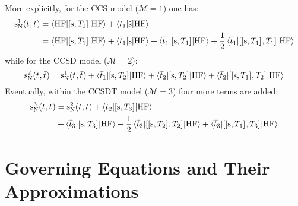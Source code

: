 More explicitly, for the \gls{CCS} model ($\mathcal{M} = 1$) one has:
\begin{equation}
  \begin{aligned}
  \mathrm{s}_{\mathrm{N}}^1(t_{}, \bar{t}_{}) &=
  \braket{\mathrm{HF} | [ \mathrm{s}, T_1 ]^{} | \mathrm{HF}}
  + \braket{\bar{t}_{1} | \check{\mathrm{s}} | \mathrm{HF}} \\
  &=
  \braket{\mathrm{HF} | [ \mathrm{s}, T_1 ]^{} | \mathrm{HF}}
  + \braket{\bar{t}_{1} | \mathrm{s} | \mathrm{HF}}
  + \braket{\bar{t}_{1} | [ \mathrm{s}, T_1 ]^{} | \mathrm{HF}}
  + \frac{1}{2}\braket{\bar{t}_{1} | [ [ \mathrm{s}, T_1 ]^{}, T_1 ]^{} | \mathrm{HF}}
  \end{aligned}
\end{equation}
while for the \gls{CCSD} model ($\mathcal{M} = 2$):
\begin{equation}
  \mathrm{s}_{\mathrm{N}}^2(t_{}, \bar{t}_{}) =
  \mathrm{s}_{\mathrm{N}}^1(t_{}, \bar{t}_{})
  + \braket{\bar{t}_{1} | [ \mathrm{s}, T_2 ]^{} | \mathrm{HF}}
  + \braket{\bar{t}_{2} | [ \mathrm{s}, T_2 ]^{} | \mathrm{HF}}
  + \braket{\bar{t}_{2} | [ [ \mathrm{s}, T_1 ]^{}, T_2 ]^{} | \mathrm{HF}}
\end{equation}
Eventually, within the \gls{CCSDT} model ($\mathcal{M} = 3$) four more
terms are added:
\begin{equation}
  \begin{aligned}
  \mathrm{s}_{\mathrm{N}}^3(t_{}, \bar{t}_{}) &=
  \mathrm{s}_{\mathrm{N}}^2(t_{}, \bar{t}_{})
  + \braket{\bar{t}_{2} | [ \mathrm{s}, T_3 ]^{} | \mathrm{HF}} \\
  &+ \braket{\bar{t}_{3} | [ \mathrm{s}, T_3 ]^{} | \mathrm{HF}}
  + \frac{1}{2}
  \braket{\bar{t}_{3} | [ [ \mathrm{s}, T_2 ]^{}, T_2 ]^{} |
  \mathrm{HF}}
  + \braket{\bar{t}_{3} | [ [ \mathrm{s}, T_1 ]^{}, T_3 ]^{} |
  \mathrm{HF}}
  \end{aligned}
\end{equation}

\section{Governing Equations and Their Approximations}\label{sec:pcm-cc-models}

